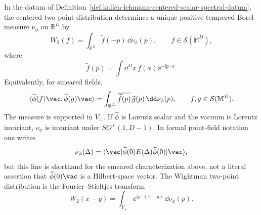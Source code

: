 \begin{proposition}
\label{prop:kallen-lehmann-two-point-spectral-measure}
In the datum of
Definition~\ref{def:kallen-lehmann-centered-scalar-spectral-datum}, the
centered two-point distribution determines a unique positive tempered Borel
measure \(\nu_\phi\) on \(\mathbb R^D\) by
\begin{equation}
  W_2(f)
  =
  \int_{\mathbb R^D}\widetilde f(-p)\,\dd\nu_\phi(p),
  \qquad
  f\in\mathcal S(\mathbb M^D),
  \label{eq:kallen-lehmann-two-point-measure-characterization}
\end{equation}
where
\[
  \widetilde f(p)=\int\dd^D x\,f(x)\ee^{-\ii p\cdot x}.
\]
Equivalently, for smeared fields,
\begin{equation}
  \langle\widehat\phi(f)\vac,\widehat\phi(g)\vac\rangle
  =
  \int_{\mathbb R^D}
    \overline{\widetilde f(p)}\,\widetilde g(p)\,
    \dd\nu_\phi(p),
  \qquad f,g\in\mathcal S(\mathbb M^D).
  \label{eq:kallen-lehmann-smeared-inner-product}
\end{equation}
The measure is supported in \(\overline V_+\).  If \(\widehat\phi\) is
Lorentz scalar and the vacuum is Lorentz invariant, \(\nu_\phi\) is invariant
under \(SO^+(1,D-1)\).  In formal point-field notation one writes
\[
  \nu_\phi(\Delta)
  =
  \langle\vac|
  \widehat\phi(0)E(\Delta)\widehat\phi(0)
  |\vac\rangle ,
\]
but this line is shorthand for the smeared characterization above, not a
literal assertion that \(\widehat\phi(0)\vac\) is a Hilbert-space vector.  The
Wightman two-point distribution is the Fourier--Stieltjes transform
\[
  W_2(x-y)
  =
  \int_{\overline V_+}\ee^{\ii p\cdot(x-y)}\,\dd\nu_\phi(p).
\]
\end{proposition}

